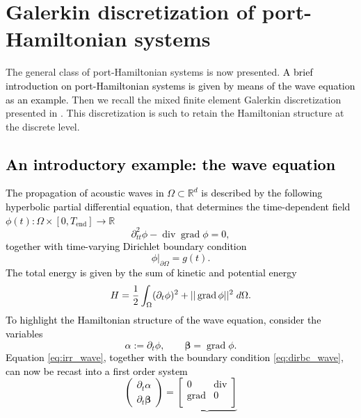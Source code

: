 \documentclass[11pt,a4paper]{article}
\DeclareMathOperator*{\grad}{grad}
\renewcommand{\div}{\operatorname{div}}
\newcommand{\revtwo}[1]{{\textcolor{black}{#1}}}
\begin{document}
\section{Galerkin discretization of port-Hamiltonian systems}\label{sec:Discretization}

The general class of port-Hamiltonian systems is now presented. \revtwo{A brief introduction on port-Hamiltonian systems is given by means of the wave equation as an example.} Then we recall the mixed finite element Galerkin discretization presented in \cite{joly2003}. This discretization is such to retain the Hamiltonian structure at the discrete level.

\revtwo{
\subsection{An introductory example: the wave equation}
The propagation of acoustic waves in $\Omega\subset \mathbb{R}^d$ is described by the following hyperbolic partial differential equation, that determines the time-dependent field $\phi(t): \Omega \times [0, T_{\mathrm{end}}] \rightarrow \mathbb{R}$
\begin{equation}\label{eq:irr_wave}
    \partial_{tt}^2 \phi - \div\grad \phi = 0,
\end{equation}
together with time-varying Dirichlet boundary condition
\begin{equation}\label{eq:dirbc_wave}
    \phi|_{\partial\Omega} = g(t).
\end{equation}
The total energy is given by the sum of kinetic and potential energy
$$
H = \frac{1}{2} \int_\Omega (\partial_t \phi)^2 + ||\grad \phi||^2 \; \rm{d}\Omega.
$$
To highlight the Hamiltonian structure of the wave equation, consider the variables
\begin{equation}
    \alpha := \partial_t \phi, \qquad \bm{\beta} = \grad \phi.
\end{equation}
Equation \eqref{eq:irr_wave}, together with the boundary condition \eqref{eq:dirbc_wave}, can now be recast into a first order system 
\begin{equation}\label{eq:mix_wave}
    \begin{pmatrix}
        \partial_t \alpha \\
        \partial_t \bm{\beta}
    \end{pmatrix} = \underbrace{\begin{bmatrix}
        0 & \div \\
        \grad & 0 \\

\end{bmatrix}}
\end{equation}}
\end{document}
